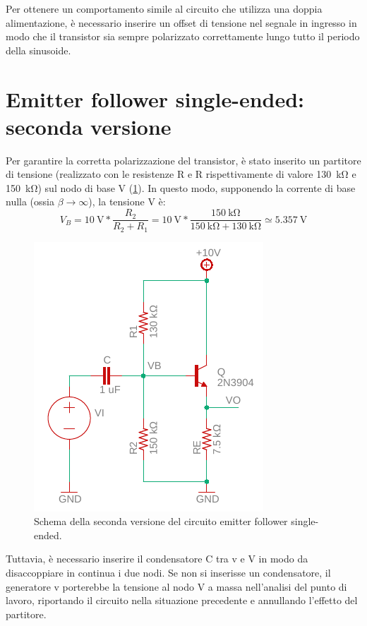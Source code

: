 \noindent
Per ottenere un comportamento simile al circuito che utilizza una doppia alimentazione, è necessario inserire un offset di tensione nel segnale in ingresso in modo che il transistor sia sempre polarizzato correttamente lungo tutto il periodo della sinusoide.

\section{Emitter follower single-ended: seconda versione}
Per garantire la corretta polarizzazione del transistor, è stato inserito un partitore di tensione (realizzato con le resistenze R e R rispettivamente di valore \SI{130}{\kilo\ohm} e \SI{150}{\kilo\ohm}) sul nodo di base V (\Fig\ref{fig:emitterfollwer_v2}). In questo modo, supponendo la corrente di base nulla (ossia $\beta\to\infty$), la tensione V è:
\begin{equation}
	V_B= \SI{10}{\volt}*\frac{R_2}{R_2+R_1}
	=\SI{10}{\volt}*\frac{\SI{150}{\kilo\ohm}}{\SI{150}{\kilo\ohm}+\SI{130}{\kilo\ohm}}\simeq\SI{5.357}{\volt}
	\label{eq:1}
\end{equation}
\begin{figure}[h!]
	\centering
	\includegraphics[width=0.4\linewidth]{./OtherFiles/Laboratorio 2/emitter follower_v2}
	\caption{Schema della seconda versione del circuito emitter follower single-ended.}
	\label{fig:emitterfollwer_v2}
\end{figure}

\noindent
Tuttavia, è necessario inserire il condensatore C tra v e V in modo da disaccoppiare in continua i due nodi. Se non si inserisse un condensatore, il generatore v porterebbe la tensione al nodo V a massa nell'analisi del punto di lavoro, riportando il circuito nella situazione precedente e annullando l'effetto del partitore.


